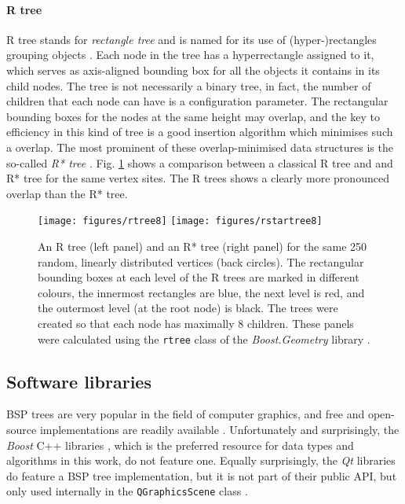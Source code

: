 \paragraph{R tree}
R tree stands for \textit{rectangle tree} and is named for its use of (hyper-)rectangles 
grouping objects \cite{wiki_rtree}.
Each node in the tree has a hyperrectangle assigned to it, which serves as axis-aligned bounding box
for all the objects it contains in its child nodes. 
The tree is not necessarily a binary tree, in fact, the number of children that each node can have is 
a configuration parameter. 
The rectangular bounding boxes for the nodes at the same height may overlap, and the key to efficiency 
in this kind of tree is a good insertion algorithm which minimises such a overlap.
The most prominent of these overlap-minimised data structures is the so-called \textit{R* tree} \cite{wiki_rstartree}.
Fig. \ref{fig:example_rtrees} shows a comparison between a classical R tree and and R* tree for the
same vertex sites. The R trees shows a clearly more pronounced overlap than the R* tree.

\begin{figure}[h]
	\begin{center}
		\texttt{[image: figures/rtree8]}
		\hspace{1cm}
		\texttt{[image: figures/rstartree8]}
	\end{center}
	\caption[Example R trees.]{An R tree (left panel) and an R* tree (right panel) for the 
		same 250 random, linearly distributed vertices (back circles). 
		The rectangular bounding boxes at each level of the R trees are marked in different colours, 
		the innermost rectangles are blue, the next level is red, and the outermost level 
		(at the root node) is black.
		The trees were created so that each node has maximally 8 children.
		These panels were calculated using the \lstinline[language=C++]|rtree| class \cite{web_boost_geometry_rtree}
		of the \textit{Boost.Geometry} library \cite{web_boost_geometry}.
		\label{fig:example_rtrees}}
\end{figure}


\subsection{Software libraries}
BSP trees are very popular in the field of computer graphics, and free and open-source implementations are 
readily available \cite{web_bsp_faq}. Unfortunately and surprisingly, the \textit{Boost} C++ libraries \cite{web_boost},
which is the preferred resource for data types and algorithms in this work, do not feature one. 
Equally surprisingly, the \textit{Qt} libraries do feature a BSP tree implementation, but it is not part of 
their public API, but only used internally in the \lstinline[language=C++]|QGraphicsScene| class \cite{web_QGraphicsScene}.

